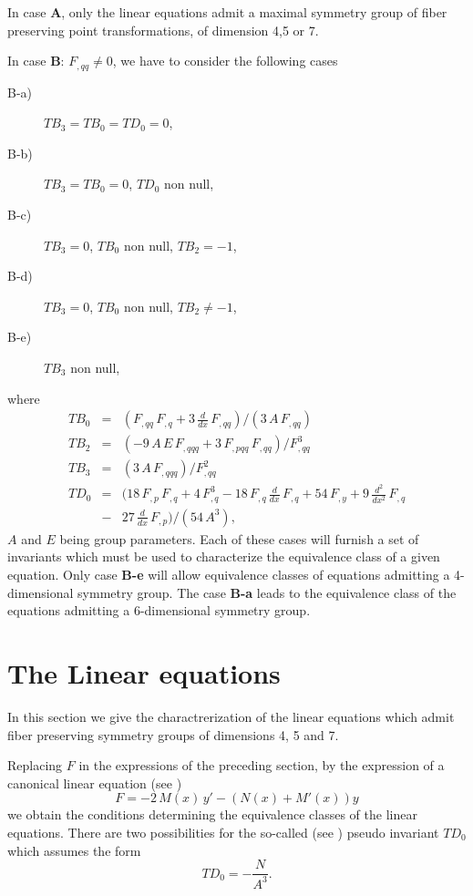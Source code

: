 In case {\bf A}, only the linear equations admit a maximal symmetry group 
of fiber preserving point transformations, of dimension 4,5 or 7.

In case {\bf B}: $F_{,qq} \neq 0$, we have to consider the following cases
\begin{description}
\item[B-a)] $TB_{3}=TB_{0}=TD_{0}=0$, 
\item[B-b)] $TB_{3}=TB_{0}=0$, $TD_{0}$ non null,
\item[B-c)] $TB_{3}=0$, $TB_{0}$ non null, $TB_{2}=-1$,
\item[B-d)] $TB_{3}=0$, $TB_{0}$ non null, $TB_{2} \neq -1$,
\item[B-e)] $TB_{3}$ non null,
\end{description}
where 
\begin{eqnarray}
\label{B_TB0}
TB_{0}&=&(F_{,qq}\,F_{,q} + 3\,\frac{d}{dx}\,F_{,qq})/(3\,A\,F_{,qq}) \\
%
\label{B_TB2}
TB_{2}&=&( - 9\,A\,E\,F_{,qqq} + 3\,F_{,pqq}\,F_{,qq})/F_{,qq}^{3} \\
%
\label{B_TB3}
TB_{3}&=&(3\,A\,F_{,qqq})/F_{,qq}^{2} \\
%
TD_{0}&=&(18\,F_{,p}\,F_{,q} 
+ 4\,F_{,q}^{3} - 18\,F_{,q}\,\frac{d}{dx}\,F_{,q} 
+ 54\,F_{,y} + 9\,\frac{d^{2}}{dx^{2}}\,F_{,q} \nonumber \\
&-& 27\,\frac{d}{dx}\,F_{,p})/(54\,A^{3}),
%
\end{eqnarray}
%
$A$ and $E$ being group parameters. Each of these cases will furnish 
a set of invariants which must be used to characterize the equivalence 
class of a given equation. Only case {\bf B-e} will allow equivalence classes 
of equations admitting a 4-dimensional symmetry group. The case 
{\bf B-a} leads to the equivalence class of the equations admitting a 
6-dimensional symmetry group. 


\section{The Linear equations}
\label{s_lin}
In this section we give the charactrerization of the linear equations 
which admit fiber preserving symmetry groups of dimensions 4, 5 and 7.
 
Replacing $F$ in the expressions of the preceding section, by the expression 
of a canonical linear equation (see \cite{B_Gregus87})
\begin{equation}
\label{can_lin}
F=-2\,M(x)\,y' -(N(x)+M'(x))y
\end{equation}
we obtain the conditions determining the equivalence classes 
of the linear equations. There are two  possibilities for the 
so-called (see \cite{P_Chern40}) pseudo invariant $TD_{0}$ which assumes 
the form
\begin{equation}
TD_{0}=-\frac{N}{A^{3}}.
\end{equation}

